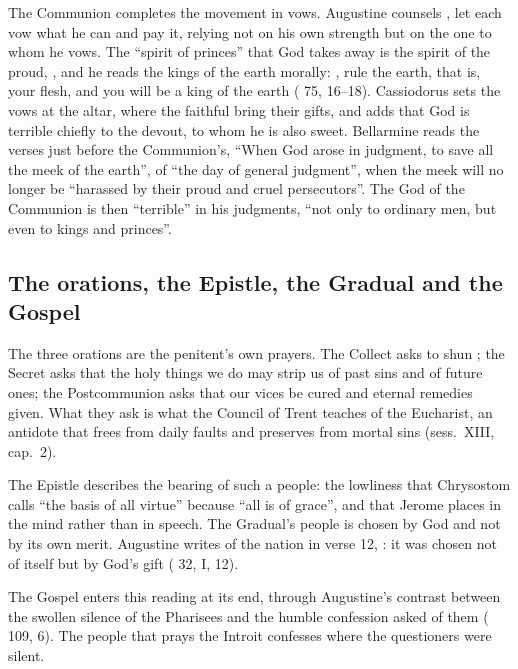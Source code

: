 The Communion completes the movement in vows. Augustine counsels
, let each vow what he can and
pay it, relying not on his own strength but on the one to whom he vows. The
``spirit of princes'' that God takes away is the spirit of the proud,
, and he reads the
kings of the earth morally: , rule the
earth, that is, your flesh, and you will be a king of the earth
( 75, 16--18). Cassiodorus sets the vows at the
altar, where the faithful bring their gifts, and adds that God is terrible
chiefly to the devout, to whom he is also sweet. Bellarmine reads the verses
just before the Communion's, ``When God arose in judgment, to save all the
meek of the earth'', of ``the day of general judgment'', when the meek will no
longer be ``harassed by their proud and cruel persecutors''. The God of the
Communion is then ``terrible'' in his judgments, ``not only to ordinary men,
but even to kings and princes''.

\subsection{The orations, the Epistle, the Gradual and the Gospel}

The three orations are the penitent's own prayers. The Collect asks to shun
; the Secret asks that the holy things we do may strip
us of past sins and of future ones; the Postcommunion asks that our vices be
cured and eternal remedies given. What they ask is what the Council of
Trent teaches of the Eucharist, an antidote that frees from daily faults and
preserves from mortal sins (sess.~XIII, cap.~2).

The Epistle describes the bearing of such a people: the lowliness that
Chrysostom calls ``the basis of all virtue'' because ``all is of grace'', and
that Jerome places in the mind rather than in speech. The Gradual's people is chosen by God and not by its own
merit. Augustine writes of the nation in verse 12, : it was chosen not of itself but by God's gift
( 32, I, 12).

The Gospel enters this reading at its end, through Augustine's contrast
between the swollen silence of the Pharisees and the humble confession asked
of them ( 109, 6). The people that prays the
Introit confesses where the questioners were silent.

